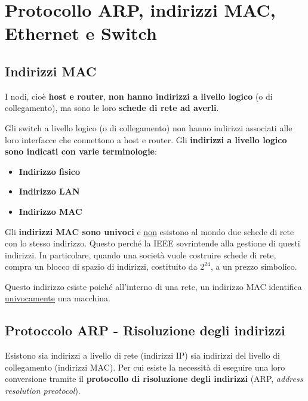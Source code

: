 \documentclass[a4paper]{article}
\begin{document}
	\section{Protocollo ARP, indirizzi MAC, Ethernet e Switch}
	
	\subsection{Indirizzi MAC}
	
	I nodi, cioè \textbf{host e router}, \textbf{non hanno indirizzi a livello logico} (o di collegamento), ma sono le loro \textbf{schede di rete ad averli}.\newline
	
	\noindent
	Gli switch a livello logico (o di collegamento) non hanno indirizzi associati alle loro interfacce che connettono a host e router. Gli \textbf{indirizzi a livello logico sono indicati con varie terminologie}:
	\begin{itemize}
		\item \textbf{Indirizzo fisico}
		\item \textbf{Indirizzo LAN}
		\item \textbf{Indirizzo MAC}
	\end{itemize}
	Gli \textbf{\textcolor{Red3}{indirizzi MAC} sono univoci} e \underline{non} esistono al mondo due schede di rete con lo stesso indirizzo. Questo perché la IEEE sovrintende alla gestione di questi indirizzi. In particolare, quando una società vuole costruire schede di rete, compra un blocco di spazio di indirizzi, costituito da $2^{24}$, a un prezzo simbolico.\newline
	
	\noindent
	Questo indirizzo esiste poiché all'interno di una rete, un indirizzo MAC identifica \underline{univocamente} una macchina.
	
	\subsection{Protoccolo ARP - Risoluzione degli indirizzi}
	
	Esistono sia indirizzi a livello di rete (indirizzi IP) sia indirizzi del livello di collegamento (indirizzi MAC). Per cui esiste la necessità di eseguire una loro conversione tramite il \textcolor{Red3}{\textbf{protocollo di risoluzione degli indirizzi}} (ARP, \emph{address resolution preotocol}).\newline
	
\end{document}
